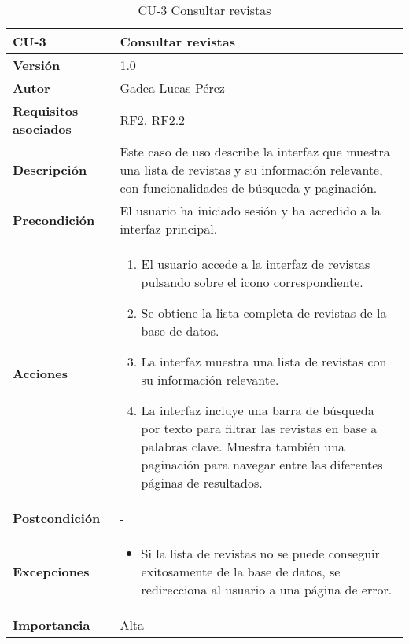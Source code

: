 \begin{itemize}
\begin{table}[p]
\centering
\begin{tabularx}{\linewidth}{ p{} p{} }
\toprule
\textbf{CU-3} & \textbf{Consultar revistas}\\
\toprule
\textbf{Versión} & 1.0 \\
\textbf{Autor} & Gadea Lucas Pérez \\
\textbf{Requisitos asociados} & RF2, RF2.2 \\
\textbf{Descripción} & Este caso de uso describe la interfaz que muestra una lista de revistas y su información relevante, con funcionalidades de búsqueda y paginación.\\
\textbf{Precondición} & El usuario ha iniciado sesión y ha accedido a la interfaz principal. \\
\textbf{Acciones} &
\begin{enumerate}
\def\labelenumi{\arabic{enumi}.}
\tightlist
\item El usuario accede a la interfaz de revistas pulsando sobre el icono correspondiente.
\item Se obtiene la lista completa de revistas de la base de datos.
\item La interfaz muestra una lista de revistas con su información relevante.
\item La interfaz incluye una barra de búsqueda por texto para filtrar las revistas en base a palabras clave. Muestra también una paginación para navegar entre las diferentes páginas de resultados.
\end{enumerate}\\
\textbf{Postcondición} & - \\
\textbf{Excepciones} &
\begin{itemize}
    \item Si la lista de revistas no se puede conseguir exitosamente de la base de datos, se redirecciona al usuario a una página de error.
\end{itemize} \\
\textbf{Importancia} & Alta\\
\bottomrule
\end{tabularx}
\caption{CU-3 Consultar revistas}
\label{tab:cu3}
\end{table}


\end{itemize}

